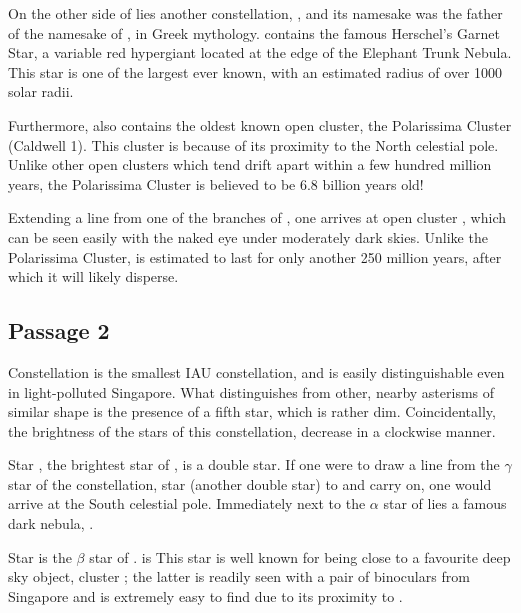 \documentclass[a4paper,11pt]{exam}
\begin{document}
On the other side of  lies another constellation, , and its namesake was the father of the namesake of , in Greek mythology.  contains the famous Herschel’s Garnet Star, a variable red hypergiant located at the edge of the Elephant Trunk Nebula. This star is one of the largest ever known, with an estimated radius of over 1000 solar radii.

Furthermore,  also contains the oldest known open cluster, the Polarissima Cluster (Caldwell 1). This cluster is because of its proximity to the North celestial pole.  Unlike other open clusters which tend drift apart within a few hundred million years, the Polarissima Cluster is believed to be 6.8 billion years old!

Extending a line from one of the branches of , one arrives at open cluster , which can be seen easily with the naked eye under moderately dark skies. Unlike the Polarissima Cluster,  is estimated to last for only another 250 million years, after which it will likely disperse.

\newpage
\subsection*{Passage 2}
Constellation  is the smallest IAU constellation, and is easily distinguishable even in light-polluted Singapore.  What distinguishes  from other, nearby asterisms of similar shape is the presence of a fifth star, which is rather dim. Coincidentally, the brightness of the stars of this constellation, decrease in a clockwise manner.

Star , the brightest star of , is a double star. If one were to draw a line from the $ \gamma $ star of the constellation, star  (another double star) to  and carry on, one would arrive at the South celestial pole. Immediately next to the $ \alpha $ star of  lies a famous dark nebula, .

Star  is the $ \beta $ star of . is This star is well known for being close to a favourite deep sky object, cluster ; the latter is readily seen with a pair of binoculars from Singapore and is extremely easy to find due to its proximity to .
\end{document}
